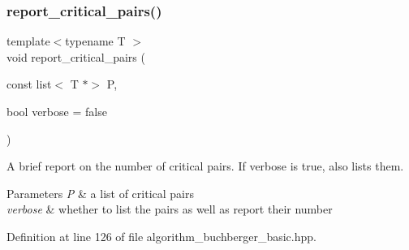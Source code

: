 \mbox{\label{group___g_b_computation_ga08267b9fbd6289d1eb28e019a11eba99}} 
\subsubsection{\texorpdfstring{report\+\_\+critical\+\_\+pairs()}{report\_critical\_pairs()}}
{\footnotesize\ttfamily template$<$typename T $>$ \\
void report\+\_\+critical\+\_\+pairs (\begin{DoxyParamCaption}\item[{const list$<$ T $\ast$$>$}]{P,  }\item[{bool}]{verbose = {\ttfamily false} }\end{DoxyParamCaption})}



A brief report on the number of critical pairs. If {\ttfamily verbose} is true, also lists them. 


\begin{DoxyParams}{Parameters}
{\em P} & a list of critical pairs \\
\hline
{\em verbose} & whether to list the pairs as well as report their number \\
\hline
\end{DoxyParams}


Definition at line 126 of file algorithm\+\_\+buchberger\+\_\+basic.\+hpp.

\mbox{\label{group___g_b_computation_ga2b4a95f98249b5b6b6f48586463fcd3b}} 
